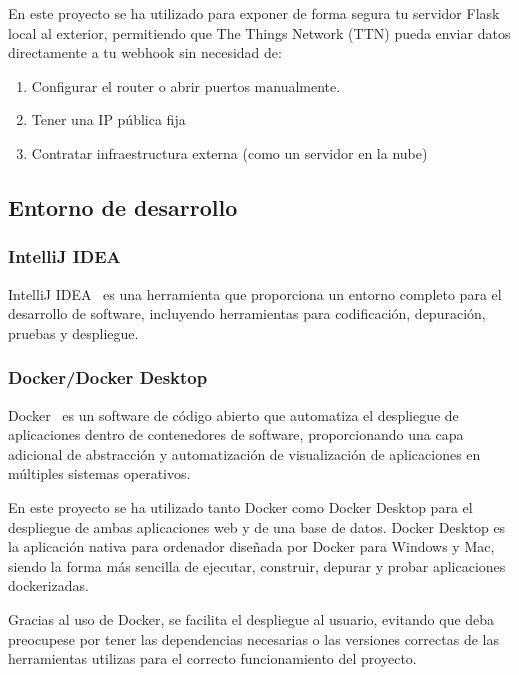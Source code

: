 En este proyecto se ha utilizado para exponer de forma segura tu servidor Flask local al exterior, permitiendo que The Things Network (TTN) pueda enviar datos directamente a tu webhook sin necesidad de:

\begin{enumerate}
    \item Configurar el router o abrir puertos manualmente.
    \item Tener una IP pública fija
    \item Contratar infraestructura externa (como un servidor en la nube)
\end{enumerate}


\subsection{Entorno de desarrollo}

\subsubsection{IntelliJ IDEA}
IntelliJ IDEA~\cite{JB:ITJ} es una herramienta que proporciona un entorno completo para el desarrollo de software, incluyendo herramientas para codificación, depuración, pruebas y despliegue.


\subsubsection{Docker/Docker Desktop}
Docker~\cite{Docker} es un software de código abierto que automatiza el despliegue de aplicaciones dentro de contenedores de software, proporcionando una capa adicional de abstracción y automatización de visualización de aplicaciones en múltiples sistemas operativos.

En este proyecto se ha utilizado tanto Docker como Docker Desktop para el despliegue de ambas aplicaciones web y de una base de datos. Docker Desktop es la aplicación nativa para ordenador diseñada por Docker para Windows y Mac, siendo la forma más sencilla de ejecutar, construir, depurar y probar aplicaciones dockerizadas.

Gracias al uso de Docker, se facilita el despliegue al usuario, evitando que deba  preocupese por tener las dependencias necesarias o las versiones correctas de las herramientas utilizas para el correcto funcionamiento del proyecto.




